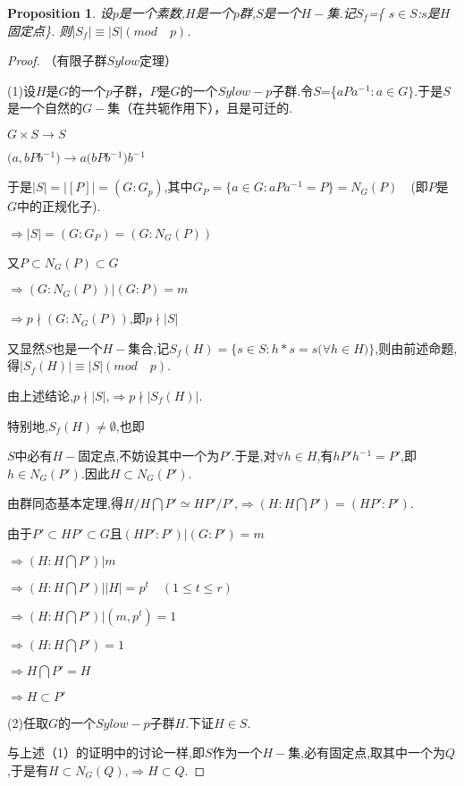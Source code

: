 \documentclass[UTF8]{article}
\newtheorem{prop}{Proposition}[section]
\begin{document}
\begin{prop}
	设$p$是一个素数,$H$是一个$p$群,$S$是一个$H-$集.记$S_f$=\{ $s\in S$:$s$是$H$固定点\}.
	则$|S_f|\equiv |S|(mod\quad p)$.
\end{prop}
\begin{proof}（有限子群$Sylow$定理）
	
	(1)设$H$是$G$的一个$p$子群，$P$是$G$的一个$Sylow-p$子群.令$S$=\{$aPa^-$$^1:a\in G\}$.于是$S$是一个自然的$G-$集（在共轭作用下），且是可迁的.
	\begin{center}
		$G\times S\rightarrow S$
		
		$(a,bPb^-$$^1)\rightarrow a(bPb^-$$^1)b^-$$^1$
	\end{center}
	
	于是$|S|=|[P]|=(G:G_p)$,其中$G_P=\{a\in G:aPa^-$$^1=P\}=N_G(P)$$\quad$(即$P$是$G$中的正规化子). 
	
	$\Rightarrow |S|=(G:G_P)=(G:N_G(P))$
	
	又$P\subset N_G(P)\subset G$
	
	$\Rightarrow (G:N_G(P))|(G:P)=m$
	
	$\Rightarrow p\nmid (G:N_G(P))$,即$p\nmid |S|$
	
	又显然$S$也是一个$H-$集合,记$S_f(H)=\{s\in S:h*s=s($${\forall}$$h\in H)\}$,则由前述命题,得$|S_f(H)|\equiv |S|(mod\quad p)$.
	
	由上述结论,$p\nmid |S|$,$\Rightarrow p\nmid |S_f(H)|$.
	
	特别地,$S_f(H)\neq$$\emptyset$,也即
	
	$S$中必有$H-$固定点,不妨设其中一个为$P'$.于是,对${\forall}$$h\in H$,有$hP'h^-$$^1=P'$,即$h\in N_G(P')$.因此$H\subset N_G(P')$. 
	
	由群同态基本定理,得$H/H\bigcap P'\simeq HP'/P'$,$\Rightarrow (H:H\bigcap P')=(HP':P')$.
	
	由于$P'\subset HP'\subset G$且$(HP':P')|(G:P')=m$
	
	$\Rightarrow (H:H\bigcap P')|m$
	
	$\Rightarrow (H:H\bigcap P')||H|=p^t$$\quad$$(1\leq t\leq r)$
	
	$\Rightarrow (H:H\bigcap P')|(m,p^t)=1$
	
	$\Rightarrow (H:H\bigcap P')=1$
	
	$\Rightarrow H\bigcap P'=H$
	
	$\Rightarrow H\subset P'$
	
	(2)任取$G$的一个$Sylow-p$子群$H$.下证$H\in S$.
	
	与上述（1）的证明中的讨论一样,即$S$作为一个$H-$集,必有固定点,取其中一个为$Q$,于是有$H\subset N_G(Q)$,$\Rightarrow H\subset Q$.
	

\end{proof}
\end{document}
